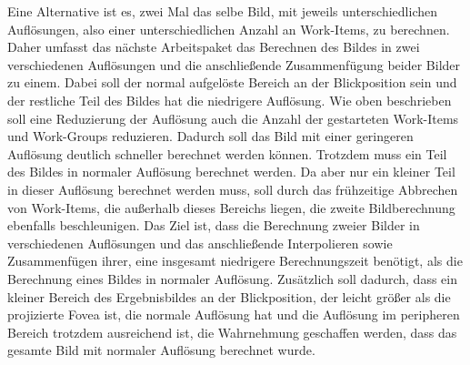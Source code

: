 Eine Alternative ist es, zwei Mal das selbe Bild, mit jeweils unterschiedlichen Auflösungen, also einer unterschiedlichen Anzahl an Work-Items, zu berechnen.
Daher umfasst das nächste Arbeitspaket das Berechnen des Bildes in zwei verschiedenen Auflösungen und die anschließende Zusammenfügung beider Bilder zu einem.
Dabei soll der normal aufgelöste Bereich an der Blickposition sein und der restliche Teil des Bildes hat die niedrigere Auflösung.
Wie oben beschrieben soll eine Reduzierung der Auflösung auch die Anzahl der gestarteten Work-Items und Work-Groups reduzieren.
Dadurch soll das Bild mit einer geringeren Auflösung deutlich schneller berechnet werden können.
Trotzdem muss ein Teil des Bildes in normaler Auflösung berechnet werden.
Da aber nur ein kleiner Teil in dieser Auflösung berechnet werden muss, soll durch das frühzeitige Abbrechen von Work-Items, die außerhalb dieses Bereichs liegen, die zweite Bildberechnung ebenfalls beschleunigen.
Das Ziel ist, dass die Berechnung zweier Bilder in verschiedenen Auflösungen und das anschließende Interpolieren sowie Zusammenfügen ihrer, eine insgesamt niedrigere Berechnungszeit benötigt, als die Berechnung eines Bildes in normaler Auflösung.
Zusätzlich soll dadurch, dass ein kleiner Bereich des Ergebnisbildes an der Blickposition, der leicht größer als die projizierte Fovea ist, die normale Auflösung hat und die Auflösung im peripheren Bereich trotzdem ausreichend ist, die Wahrnehmung geschaffen werden, dass das gesamte Bild mit normaler Auflösung berechnet wurde.

